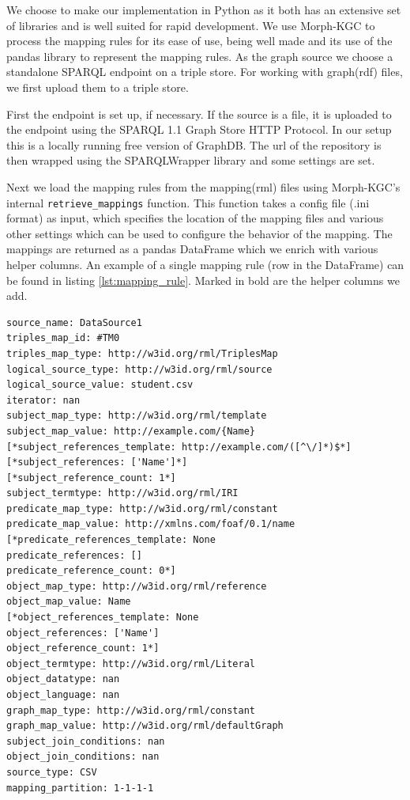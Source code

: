 We choose to make our implementation in Python as it both has an extensive set of libraries and is well suited for rapid development. We use Morph-KGC to process the mapping rules for its ease of use, being well made and its use of the pandas library to represent the mapping rules. As the graph source we choose a standalone SPARQL endpoint on a triple store. For working with graph(\acrshort{rdf}) files, we first upload them to a triple store.

First the endpoint is set up, if necessary. If the source is a file, it is uploaded to the endpoint using the SPARQL 1.1 Graph Store HTTP Protocol. In our setup this is a locally running free version of GraphDB. The url of the repository is then wrapped using the SPARQLWrapper library and some settings are set.

Next we load the mapping rules from the mapping(\acrshort{rml}) files using Morph-KGC's internal \texttt{retrieve\_mappings} function. This function takes a config file (.ini format) as input, which specifies the location of the mapping files and various other settings which can be used to configure the behavior of the mapping. The mappings are returned as a pandas DataFrame which we enrich with various helper columns. An example of a single mapping rule (row in the DataFrame) can be found in listing \ref{lst:mapping_rule}. Marked in bold are the helper columns we add.

\begin{lstlisting}[caption={Example of a mapping rule in Morph-KGC}, label={lst:mapping_rule}, captionpos=b, basicstyle=\small]
source_name: DataSource1
triples_map_id: #TM0
triples_map_type: http://w3id.org/rml/TriplesMap
logical_source_type: http://w3id.org/rml/source
logical_source_value: student.csv
iterator: nan
subject_map_type: http://w3id.org/rml/template
subject_map_value: http://example.com/{Name}
[*subject_references_template: http://example.com/([^\/]*)$*]
[*subject_references: ['Name']*]
[*subject_reference_count: 1*]
subject_termtype: http://w3id.org/rml/IRI
predicate_map_type: http://w3id.org/rml/constant
predicate_map_value: http://xmlns.com/foaf/0.1/name
[*predicate_references_template: None
predicate_references: []
predicate_reference_count: 0*]
object_map_type: http://w3id.org/rml/reference
object_map_value: Name
[*object_references_template: None
object_references: ['Name']
object_reference_count: 1*]
object_termtype: http://w3id.org/rml/Literal
object_datatype: nan
object_language: nan
graph_map_type: http://w3id.org/rml/constant
graph_map_value: http://w3id.org/rml/defaultGraph
subject_join_conditions: nan
object_join_conditions: nan
source_type: CSV
mapping_partition: 1-1-1-1
\end{lstlisting}

